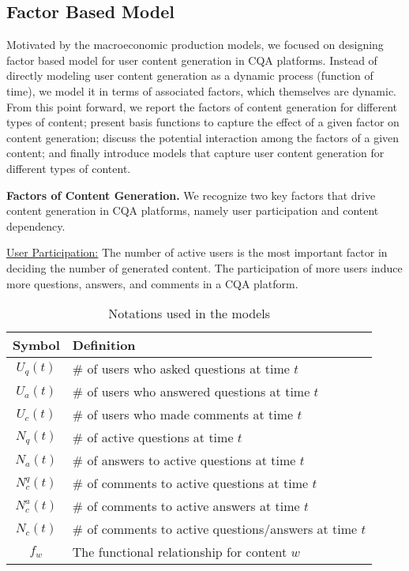 \subsection{Factor Based Model} 
Motivated by the macroeconomic production models, we focused on designing factor based model for user content generation in CQA platforms. Instead of directly modeling user content generation as a dynamic process (function of time), we model it in terms of associated factors, which themselves are dynamic. From this point forward, we report the factors of content generation for different types of content; present basis functions to capture the effect of a given factor on content generation; discuss the potential interaction among the factors of a given content; and finally introduce models that capture user content generation for different types of content.

\textbf{Factors of Content Generation.} We recognize two key factors that drive content generation in CQA platforms, namely user participation and content dependency.

\uline{User Participation:} The number of active users is the most important factor in deciding the number of generated content. The participation of more users induce more questions, answers, and comments in a CQA platform.

\begin{table}[thb]
	\centering
	\begin{tabular}{cl}
	\hline
	\textbf{Symbol} & \textbf{Definition}\\ \hline
	$U_q(t)$ & \# of users who asked questions at time $t$\\ 
	$U_a(t)$ & \# of users who answered questions at time $t$\\
	$U_c(t)$ & \# of users who made comments at time $t$\\
	$N_q(t)$ & \# of active questions at time $t$\\
	$N_a(t)$ & \# of answers to active questions at time $t$\\
	$N_c^q(t)$ & \# of comments to active questions at time $t$\\
	$N_c^a(t)$ & \# of comments to active answers at time $t$\\
    $N_c(t)$ & \# of comments to active questions/answers at time $t$\\
	$f_w$ & The functional relationship for content $w$\\ \hline
	 \end{tabular}
    \caption{Notations used in the models}
    \label{notations}
\end{table}

